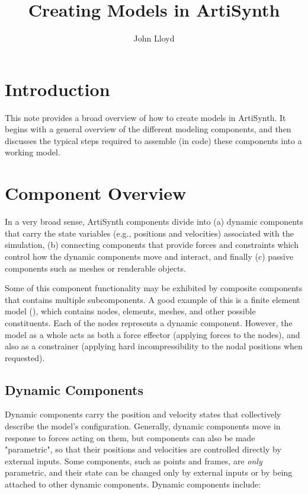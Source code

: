 \documentclass{article}
\title{Creating Models in ArtiSynth}
\author{John Lloyd}
\date{}
\def\fem{artisynth.core.femmodels}
\begin{document}

\maketitle




\section{Introduction}

This note provides a broad overview of
how to create models in ArtiSynth. It begins with a general overview
of the different modeling components, and then discusses the typical steps
required to assemble (in code) these components into a working model.

\section{Component Overview}

In a very broad sense, ArtiSynth components divide into (a) dynamic
components that carry the state variables (e.g., positions and
velocities) associated with the simulation, (b) connecting components
that provide forces and constraints which control how the dynamic
components move and interact, and finally (c) passive components such
as meshes or renderable objects.

Some of this component functionality may be exhibited by composite
components that contains multiple subcomponents.  A good example of
this is a finite element model (\javaclass[\fem]{FemModel3d}), which
contains nodes, elements, meshes, and other possible
constituents. Each of the nodes represents a dynamic component.
However, the model as a whole acts as both a force effector (applying
forces to the nodes), and also as a constrainer (applying hard
incompressibility to the nodal positions when requested).

\subsection{Dynamic Components}
\label{DynamicComponents:sec}

Dynamic components carry the position and velocity states that
collectively describe the model's configuration. Generally, dynamic
components move in response to forces acting on them, but components
can also be made "parametric", so that their positions and velocities
are controlled directly by external inputs. Some components, such as
points and frames, are {\it only} parametric, and their state can be
changed only by external inputs or by being attached to other dynamic
components. Dynamic components include:
\end{document}
